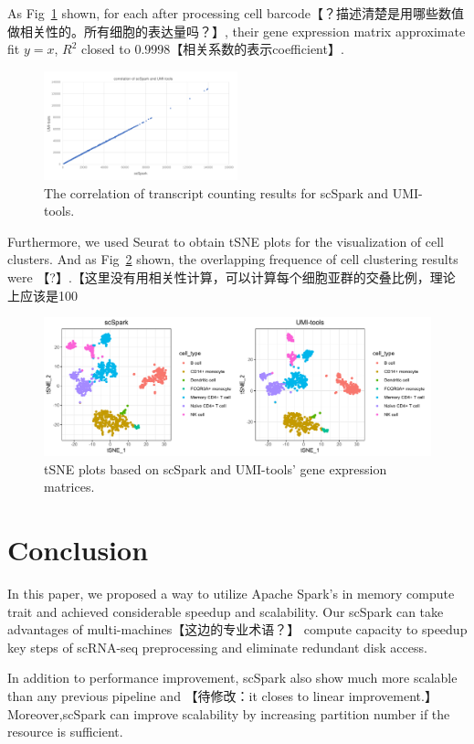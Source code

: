 \documentclass[conference]{IEEEtran}
\begin{document}
  As Fig~\ref{fig9} shown, for each after processing cell barcode【？描述清楚是用哪些数值做相关性的。所有细胞的表达量吗？】, their gene expression matrix approximate fit $y=x$, $R^{2}$ closed to 0.9998【相关系数的表示coefficient】. 
  \begin{figure}
    \includegraphics[width=0.5\textwidth]{fig9.pdf}
    \caption{The correlation of transcript counting results for scSpark and UMI-tools.} \label{fig9}
  \end{figure}
  Furthermore, we used Seurat to obtain tSNE plots for the visualization of cell clusters. 
  And as Fig~\ref{fig10} shown, the overlapping frequence of cell clustering results were 【?】.【这里没有用相关性计算，可以计算每个细胞亚群的交叠比例，理论上应该是100%
  \begin{figure}
    \includegraphics[width=\textwidth]{fig10.pdf}
    \caption{tSNE plots based on scSpark and UMI-tools' gene expression matrices.} \label{fig10}
  \end{figure}
  \section{Conclusion}
  In this paper, we proposed a way to utilize Apache Spark's in memory compute trait and achieved considerable speedup and scalability. 
  Our scSpark can take advantages of multi-machines【这边的专业术语？】 compute capacity to speedup key steps of scRNA-seq preprocessing and eliminate redundant disk access. 
  
  In addition to performance improvement, scSpark also show much more scalable than any previous pipeline and 【待修改：it closes to linear improvement.】
  Moreover,scSpark can improve scalability by increasing partition number if the resource is sufficient.
  
\end{document}
